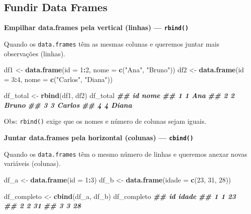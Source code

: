 \documentclass[
]{book}
\newenvironment{Shaded}{\begin{snugshade}}{\end{snugshade}}
\newcommand{\AttributeTok}[1]{\textcolor[rgb]{0.13,0.29,0.53}{#1}}
\newcommand{\DecValTok}[1]{\textcolor[rgb]{0.00,0.00,0.81}{#1}}
\newcommand{\DocumentationTok}[1]{\textcolor[rgb]{0.56,0.35,0.01}{\textbf{\textit{#1}}}}
\newcommand{\FunctionTok}[1]{\textcolor[rgb]{0.13,0.29,0.53}{\textbf{#1}}}
\newcommand{\NormalTok}[1]{#1}
\newcommand{\OtherTok}[1]{\textcolor[rgb]{0.56,0.35,0.01}{#1}}
\newcommand{\SpecialCharTok}[1]{\textcolor[rgb]{0.81,0.36,0.00}{\textbf{#1}}}
\newcommand{\StringTok}[1]{\textcolor[rgb]{0.31,0.60,0.02}{#1}}
\begin{document}
\subsection{Fundir Data Frames}\label{fundir-data-frames}

\textbf{Empilhar data.frames pela vertical (linhas) --- \texttt{rbind()}}

Quando os \texttt{data.frames} têm as mesmas colunas e queremos juntar mais observações (linhas).

\begin{Shaded}
\begin{Highlighting}[]
\NormalTok{df1 }\OtherTok{\textless{}{-}} \FunctionTok{data.frame}\NormalTok{(}\AttributeTok{id =} \DecValTok{1}\SpecialCharTok{:}\DecValTok{2}\NormalTok{, }\AttributeTok{nome =} \FunctionTok{c}\NormalTok{(}\StringTok{"Ana"}\NormalTok{, }\StringTok{"Bruno"}\NormalTok{))}
\NormalTok{df2 }\OtherTok{\textless{}{-}} \FunctionTok{data.frame}\NormalTok{(}\AttributeTok{id =} \DecValTok{3}\SpecialCharTok{:}\DecValTok{4}\NormalTok{, }\AttributeTok{nome =} \FunctionTok{c}\NormalTok{(}\StringTok{"Carlos"}\NormalTok{, }\StringTok{"Diana"}\NormalTok{))}

\NormalTok{df\_total }\OtherTok{\textless{}{-}} \FunctionTok{rbind}\NormalTok{(df1, df2)}
\NormalTok{df\_total}
\DocumentationTok{\#\#   id   nome}
\DocumentationTok{\#\# 1  1    Ana}
\DocumentationTok{\#\# 2  2  Bruno}
\DocumentationTok{\#\# 3  3 Carlos}
\DocumentationTok{\#\# 4  4  Diana}
\end{Highlighting}
\end{Shaded}

Obs: \texttt{rbind()} exige que os nomes e número de colunas sejam iguais.

\textbf{Juntar data.frames pela horizontal (colunas) --- \texttt{cbind()}}

Quando os \texttt{data.frames} têm o mesmo número de linhas e queremos anexar novas variáveis (colunas).

\begin{Shaded}
\begin{Highlighting}[]
\NormalTok{df\_a }\OtherTok{\textless{}{-}} \FunctionTok{data.frame}\NormalTok{(}\AttributeTok{id =} \DecValTok{1}\SpecialCharTok{:}\DecValTok{3}\NormalTok{)}
\NormalTok{df\_b }\OtherTok{\textless{}{-}} \FunctionTok{data.frame}\NormalTok{(}\AttributeTok{idade =} \FunctionTok{c}\NormalTok{(}\DecValTok{23}\NormalTok{, }\DecValTok{31}\NormalTok{, }\DecValTok{28}\NormalTok{))}

\NormalTok{df\_completo }\OtherTok{\textless{}{-}} \FunctionTok{cbind}\NormalTok{(df\_a, df\_b)}
\NormalTok{df\_completo}
\DocumentationTok{\#\#   id idade}
\DocumentationTok{\#\# 1  1    23}
\DocumentationTok{\#\# 2  2    31}
\DocumentationTok{\#\# 3  3    28}
\end{Highlighting}
\end{Shaded}
\end{document}
